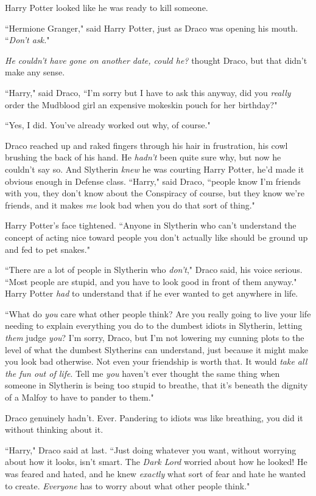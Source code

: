 Harry Potter looked like he was ready to kill someone.

``Hermione Granger," said Harry Potter, just as Draco was opening his mouth. ``\emph{Don't ask.}"

\emph{He couldn't have gone on another date, could he?} thought Draco, but that didn't make any sense.

``Harry," said Draco, ``I'm sorry but I have to ask this anyway, did you \emph{really} order the Mudblood girl an expensive mokeskin pouch for her birthday?"

``Yes, I did. You've already worked out why, of course."

Draco reached up and raked fingers through his hair in frustration, his cowl brushing the back of his hand. He \emph{hadn't} been quite sure why, but now he couldn't say so. And Slytherin \emph{knew} he was courting Harry Potter, he'd made it obvious enough in Defense class. ``Harry," said Draco, ``people know I'm friends with you, they don't know about the Conspiracy of course, but they know we're friends, and it makes \emph{me} look bad when you do that sort of thing."

Harry Potter's face tightened. ``Anyone in Slytherin who can't understand the concept of acting nice toward people you don't actually like should be ground up and fed to pet snakes."

``There are a lot of people in Slytherin who \emph{don't}," Draco said, his voice serious. ``Most people are stupid, and you have to look good in front of them anyway." Harry Potter \emph{had} to understand that if he ever wanted to get anywhere in life.

``What do \emph{you} care what other people think? Are you really going to live your life needing to explain everything you do to the dumbest idiots in Slytherin, letting \emph{them} judge \emph{you}? I'm sorry, Draco, but I'm not lowering my cunning plots to the level of what the dumbest Slytherins can understand, just because it might make you look bad otherwise. Not even your friendship is worth that. It would \emph{take all the fun out of life}. Tell me \emph{you} haven't ever thought the same thing when someone in Slytherin is being too stupid to breathe, that it's beneath the dignity of a Malfoy to have to pander to them."

Draco genuinely hadn't. Ever. Pandering to idiots was like breathing, you did it without thinking about it.

``Harry," Draco said at last. ``Just doing whatever you want, without worrying about how it looks, isn't smart. The \emph{Dark Lord} worried about how he looked! He was feared and hated, and he knew \emph{exactly} what sort of fear and hate he wanted to create. \emph{Everyone} has to worry about what other people think."

